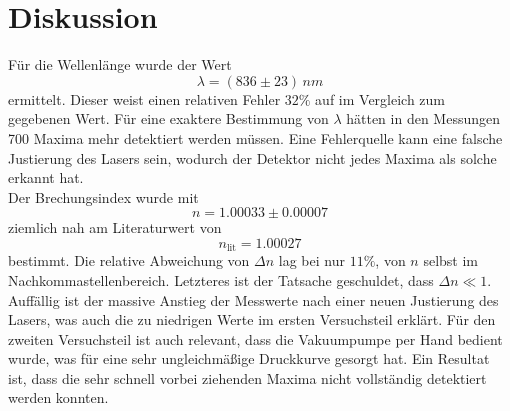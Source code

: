 \section{Diskussion}
\label{sec:Diskussion}

Für die Wellenlänge wurde der Wert
\[
	\lambda = (836 \pm 23) \, \si{nm}
\]
ermittelt. Dieser weist einen relativen Fehler $32\%$ auf im Vergleich zum gegebenen Wert. 
Für eine exaktere Bestimmung
von $\lambda$ hätten in den Messungen 700 Maxima mehr detektiert werden müssen. Eine
Fehlerquelle kann eine falsche Justierung des Lasers sein, wodurch der Detektor nicht
jedes Maxima als solche erkannt hat.
\\
Der Brechungsindex wurde mit 
\[
	n = 1.00033 \pm 0.00007 
\]
ziemlich nah am Literaturwert \cite{reflactiveindex} von
\[
	n_\text{lit} = 1.00027
\]
bestimmt. Die relative Abweichung von $\Delta n$ lag bei nur $11\%$, von $n$ selbst im
Nachkommastellenbereich. Letzteres ist der Tatsache geschuldet, dass $\Delta n \ll 1$.
Auffällig ist der massive Anstieg der Messwerte nach einer neuen Justierung des Lasers,
was auch die zu niedrigen Werte im ersten Versuchsteil erklärt. Für den zweiten
Versuchsteil ist auch relevant, dass die Vakuumpumpe per Hand bedient wurde, was für eine
sehr ungleichmäßige Druckkurve gesorgt hat. Ein Resultat ist, dass die sehr schnell vorbei
ziehenden Maxima nicht vollständig detektiert werden konnten.


